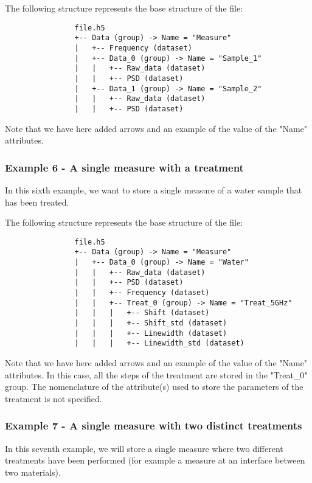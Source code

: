\documentclass{article}
\begin{document}
            The following structure represents the base structure of the file:
            \begin{verbatim}
                file.h5
                +-- Data (group) -> Name = "Measure"
                |   +-- Frequency (dataset)
                |   +-- Data_0 (group) -> Name = "Sample_1"
                |   |   +-- Raw_data (dataset)
                |   |   +-- PSD (dataset)
                |   +-- Data_1 (group) -> Name = "Sample_2"
                |   |   +-- Raw_data (dataset)
                |   |   +-- PSD (dataset)
            \end{verbatim}
            Note that we have here added arrows and an example of the value of the "Name" attributes.

        \subsubsection{Example 6 - A single measure with a treatment}
            In this sixth example, we want to store a single measure of a water sample that has been treated.

            The following structure represents the base structure of the file:
            \begin{verbatim}
                file.h5
                +-- Data (group) -> Name = "Measure"
                |   +-- Data_0 (group) -> Name = "Water"
                |   |   +-- Raw_data (dataset)
                |   |   +-- PSD (dataset)
                |   |   +-- Frequency (dataset)
                |   |   +-- Treat_0 (group) -> Name = "Treat_5GHz"
                |   |   |   +-- Shift (dataset)
                |   |   |   +-- Shift_std (dataset)
                |   |   |   +-- Linewidth (dataset)
                |   |   |   +-- Linewidth_std (dataset)
            \end{verbatim}
            Note that we have here added arrows and an example of the value of the "Name" attributes.
            In this case, all the steps of the treatment are stored in the "Treat\_0" group. The nomenclature of the attribute(s) used to store the parameters of the treatment is not specified.
        
        \subsubsection{Example 7 - A single measure with two distinct treatments}
            In this seventh example, we will store a single measure where two different treatments have been performed (for example a measure at an interface between two materials).
\end{document}

